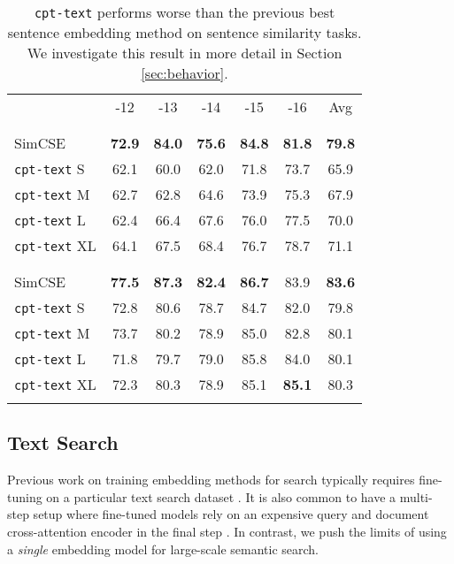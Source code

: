 \documentclass[nohyperref]{article}
\begin{document}
\begin{table}[]
\small
\setlength{\tabcolsep}{3pt}
\centering
\begin{tabular}{lcccccc}
\multicolumn{1}{r}{} STS & -12 & -13 & -14 & -15 & -16 & Avg \\ 
\Xhline{2.5\arrayrulewidth}
\multicolumn{7}{c}{Unsupervised} \\ 
\Xhline{1\arrayrulewidth} \\[-1.5ex]
SimCSE \cite{simcse}  & \textbf{72.9} & \textbf{84.0} & \textbf{75.6} & \textbf{84.8} & \textbf{81.8} & \textbf{79.8} \\ 
\texttt{cpt-text} S & 62.1 & 60.0 & 62.0 & 71.8 & 73.7 & 65.9 \\
\texttt{cpt-text} M & 62.7 & 62.8 & 64.6 & 73.9 & 75.3 & 67.9 \\
\texttt{cpt-text} L & 62.4 & 66.4 & 67.6 & 76.0 & 77.5 & 70.0 \\
\texttt{cpt-text} XL & 64.1 & 67.5 & 68.4 & 76.7 & 78.7 & 71.1 \\ 
\Xhline{2.5\arrayrulewidth}
\multicolumn{7}{c}{Transfer from NLI} \\ 
\Xhline{1\arrayrulewidth} \\[-1.5ex]
SimCSE \cite{simcse} & \textbf{77.5} & \textbf{87.3} & \textbf{82.4} & \textbf{86.7} & 83.9 & \textbf{83.6} \\
\texttt{cpt-text} S & 72.8 & 80.6 & 78.7 & 84.7 & 82.0 & 79.8 \\
\texttt{cpt-text} M & 73.7 & 80.2 & 78.9 & 85.0 & 82.8 & 80.1 \\
\texttt{cpt-text} L & 71.8 & 79.7 & 79.0 & 85.8 & 84.0 & 80.1 \\
\texttt{cpt-text} XL & 72.3 & 80.3 & 78.9 & 85.1 & \textbf{85.1} & 80.3 \\
\Xhline{2.5\arrayrulewidth}
\end{tabular}
\caption{\texttt{cpt-text} performs worse than the previous best sentence embedding method on sentence similarity tasks. We investigate this result in more detail in Section \ref{sec:behavior}.}
\label{table:sts}
\end{table}


\subsection{Text Search}

Previous work on training embedding methods for search typically requires fine-tuning on a particular text search dataset \cite{dpr, e2e, Qu}. It is also common to have a multi-step setup where fine-tuned models rely on an expensive query and document cross-attention encoder in the final step \cite{Qu, mini}. In contrast, we push the limits of using a \textit{single} embedding model for large-scale semantic search.
\end{document}
